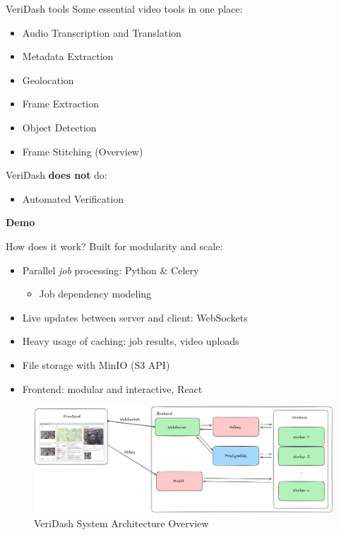 \documentclass{beamer}
\begin{document}
  \begin{frame}{VeriDash tools}
    Some essential video tools in one place:
    \begin{itemize}
      \item Audio Transcription and Translation
      \item Metadata Extraction
      \item Geolocation
      \item Frame Extraction
      \item Object Detection
      \item Frame Stitching (Overview)
    \end{itemize}

    VeriDash \textbf{does not} do:
    \begin{itemize}
      \item Automated Verification  %
    \end{itemize}
  \end{frame}

  \begin{frame}
    \centering
    \textbf{Demo}
  \end{frame}

  \begin{frame}{How does it work?}
    Built for modularity and scale:
    \begin{itemize}
      \item {
        Parallel \textit{job} processing: Python \& Celery  %
        \begin{itemize}
          \item Job dependency modeling
        \end{itemize}
      }
      \item Live updates between server and client: WebSockets
      \item Heavy usage of caching: job results, video uploads
      \item File storage with MinIO (S3 API)
      \item Frontend: modular and interactive, React
    \end{itemize}
  \end{frame}

  \begin{frame}
    \begin{figure}
      \centering
      \includegraphics[width=\textwidth]{figures/veridash-system-architecture.png}
      \caption{VeriDash System Architecture Overview}
    \end{figure}
  \end{frame}
\end{document}
